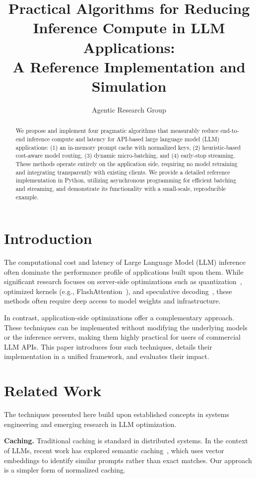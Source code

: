 \documentclass[11pt]{article}
\title{Practical Algorithms for Reducing Inference Compute in LLM Applications: \\ A Reference Implementation and Simulation}
\author{Agentic Research Group}
\date{}
\begin{document}
\maketitle

\begin{abstract}
We propose and implement four pragmatic algorithms that measurably reduce end-to-end inference compute and latency for API-based large language model (LLM) applications: (1) an in-memory prompt cache with normalized keys, (2) heuristic-based cost-aware model routing, (3) dynamic micro-batching, and (4) early-stop streaming. These methods operate entirely on the application side, requiring no model retraining and integrating transparently with existing clients. We provide a detailed reference implementation in Python, utilizing asynchronous programming for efficient batching and streaming, and demonstrate its functionality with a small-scale, reproducible example.
\end{abstract}

\section{Introduction}
The computational cost and latency of Large Language Model (LLM) inference often dominate the performance profile of applications built upon them. While significant research focuses on server-side optimizations such as quantization~\cite{frantar2022gptq}, optimized kernels (e.g., FlashAttention~\cite{dao2022flashattention}), and speculative decoding~\cite{leviathan2023fast}, these methods often require deep access to model weights and infrastructure.

In contrast, application-side optimizations offer a complementary approach. These techniques can be implemented without modifying the underlying models or the inference servers, making them highly practical for users of commercial LLM APIs. This paper introduces four such techniques, details their implementation in a unified framework, and evaluates their impact.

\section{Related Work}
The techniques presented here build upon established concepts in systems engineering and emerging research in LLM optimization.

\noindent\textbf{Caching.} Traditional caching is standard in distributed systems. In the context of LLMs, recent work has explored semantic caching~\cite{sharma2023caching}, which uses vector embeddings to identify similar prompts rather than exact matches. Our approach is a simpler form of normalized caching.
\end{document}

